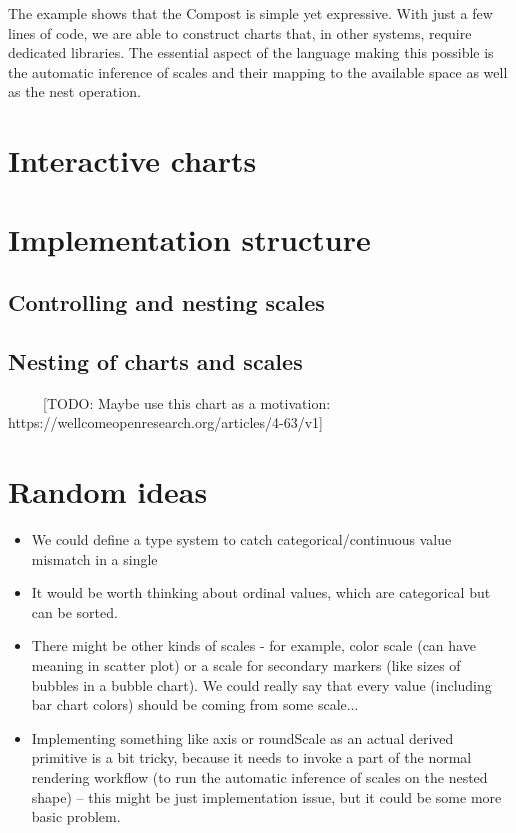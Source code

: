 \documentclass{jfp}
\newcommand{\kvd}[1]{\textnormal{\textcolor{kvdclr}{\sffamily #1}}}
\begin{document}
The example shows that the Compost is simple yet expressive. With just
a few lines of code, we are able to construct charts that, in other systems, require dedicated
libraries. The essential aspect of the language making this possible is the automatic inference
of scales and their mapping to the available space as well as the \kvd{nest} operation.

\section{Interactive charts}

\newpage

\section{Implementation structure}
\label{sec:impl}

\newpage


\subsection*{Controlling and nesting scales}


\subsection*{Nesting of charts and scales}

~
~
~
[TODO: Maybe use this chart as a motivation: https://wellcomeopenresearch.org/articles/4-63/v1]
~
\section{Random ideas}
\begin{itemize}
\item We could define a type system to catch categorical/continuous value mismatch in a single %
\item It would be worth thinking about ordinal values, which are categorical but can be sorted.
\item There might be other kinds of scales - for example, color scale (can have meaning in scatter plot)
 or a scale for secondary markers (like sizes of bubbles in a bubble chart). We could really say that
 every value (including bar chart colors) should be coming from some scale...
\item Implementing something like \kvd{axis} or \kvd{roundScale} as an actual derived primitive is
 a bit tricky, because it needs to invoke a part of the normal rendering workflow (to run the
 automatic inference of scales on the nested shape) -- this might be just implementation issue,
 but it could be some more basic problem.
\end{itemize}
\end{document}

